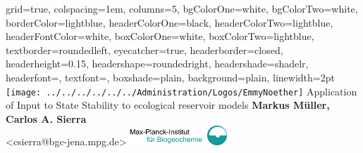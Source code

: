 \documentclass[portrait,final,a0paper,fontscale=0.285]{baposter}
\begin{document}



\newcommand{\numberofcolumns}{5}
\begin{poster}%
  {
  grid=true,
  colspacing=1em,
  columns=5,
  bgColorOne=white,
  bgColorTwo=white,
  borderColor=lightblue,
  headerColorOne=black,
  headerColorTwo=lightblue,
  headerFontColor=white,
  boxColorOne=white,
  boxColorTwo=lightblue,
  textborder=roundedleft,
  eyecatcher=true,
  headerborder=closed,
  headerheight=0.15\textheight,
  headershape=roundedright,
  headershade=shadelr,
  headerfont=\Large, %
  textfont={\setlength{\parindent}{1.5em}},
  boxshade=plain,
  background=plain,
  linewidth=2pt
  }
  {\texttt{[image: ../../../../../../Administration/Logos/EmmyNoether]}
  } 
  {Application of Input to State Stability to ecological reservoir models}
  {
 {\bf  Markus M\"uller, Carlos A. Sierra}   \\
  {\small  <csierra@bgc-jena.mpg.de> } %
  }
  {%
   \includegraphics[height=2em]{BGClogo}
  }

  \newcommand{\leftspan}{2}
  \newcommand{\leftcol}{0}


\end{poster}
\end{document}
